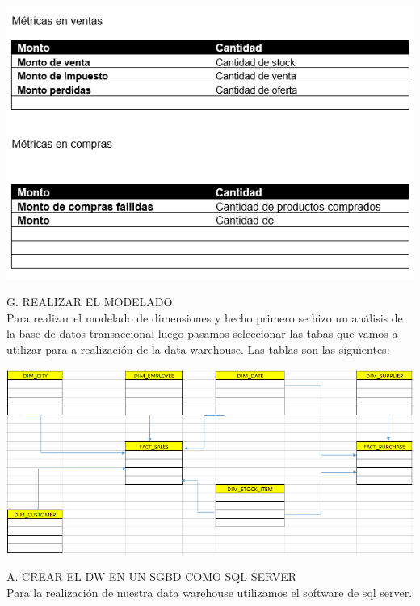 \documentclass[12pt,letterpaper]{article}
\begin{document}
\begin{center}
\includegraphics[width=17cm]{IMG/13.png} 
\end{center}

G.	REALIZAR EL MODELADO\\

Para realizar el modelado de dimensiones y hecho primero se hizo un an\'alisis de la base de datos transaccional luego pasamos seleccionar las tabas que vamos a utilizar para a realizaci\'on de la data warehouse.
Las tablas son las siguientes: \\

\begin{center}
\includegraphics[width=17cm]{IMG/14.png} 
\end{center}

A.	CREAR EL DW EN UN SGBD COMO SQL SERVER\\

Para la realizaci\'on de nuestra data warehouse utilizamos el software  de sql server. \\
\end{document}
